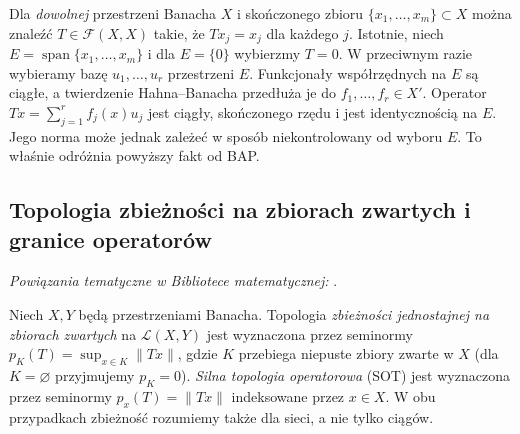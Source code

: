 \begin{uwaga}
\label{rem:finite-exact28}
Dla \emph{dowolnej} przestrzeni Banacha $X$ i skończonego
zbioru $\{x_1,\ldots,x_m\}\subset X$ można znaleźć
$T\in\mathcal F(X,X)$ takie, że $Tx_j=x_j$ dla każdego $j$.
Istotnie, niech $E=\operatorname{span}\{x_1,\ldots,x_m\}$
i dla $E=\{0\}$ wybierzmy $T=0$. W przeciwnym razie
wybieramy bazę $u_1,\ldots,u_r$ przestrzeni $E$.
Funkcjonały współrzędnych na $E$ są ciągłe, a twierdzenie
Hahna--Banacha przedłuża je do $f_1,\ldots,f_r\in X'$.
Operator $Tx=\sum_{j=1}^rf_j(x)u_j$ jest ciągły,
skończonego rzędu i jest identycznością na $E$.
Jego norma może jednak zależeć w sposób niekontrolowany
od wyboru $E$. To właśnie odróżnia powyższy fakt od BAP.
\end{uwaga}

\subsection{Topologia zbieżności na zbiorach zwartych i granice operatorów}

\noindent\emph{Powiązania tematyczne w Bibliotece matematycznej:} .


\begin{definicja}
\label{def:topologies-ap28}
Niech $X,Y$ będą przestrzeniami Banacha. Topologia
\emph{zbieżności jednostajnej na zbiorach zwartych}
na $\mathcal L(X,Y)$ jest wyznaczona przez seminormy
$p_K(T)=\sup_{x\in K}\|Tx\|$, gdzie $K$ przebiega
niepuste zbiory zwarte w $X$ (dla $K=\varnothing$ przyjmujemy
$p_K=0$). \emph{Silna topologia operatorowa}
(SOT) jest wyznaczona przez seminormy $p_x(T)=\|Tx\|$
indeksowane przez $x\in X$. W obu przypadkach
zbieżność rozumiemy także dla sieci, a nie tylko ciągów.
\end{definicja}


